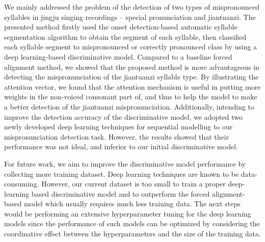 We mainly addressed the problem of the detection of two types of mispronounced syllables in jingju singing recordings -- special pronunciation and \gls{jiantuanzi}. The presented method firstly used the onset detection-based automatic syllable segmentation algorithm to obtain the segment of each syllable, then classified each syllable segment to mispronounced or correctly pronounced class by using a deep learning-based discriminative model. Compared to a baseline forced alignment method, we showed that the proposed method is more advantageous in detecting the mispronunciation of the \gls{jiantuanzi} syllable type. By illustrating the attention vector, we found that the attention mechanism is useful in putting more weights in the non-voiced consonant part of, and thus to help the model to make a better detection of the \gls{jiantuanzi} mispronunciation. Additionally, intending to improve the detection accuracy of the discriminative model, we adopted two newly developed deep learning techniques for sequential modelling to our mispronunciation detection task. However, the results showed that their performance was not ideal, and inferior to our initial discriminative model.

For future work, we aim to improve the discriminative model performance by collecting more training dataset. Deep learning techniques are known to be data-consuming. However, our current dataset is too small to train a proper deep-learning based discriminative model and to outperform the forced alignment-based model which usually requires much less training data. The next steps would be performing an extensive hyperparameter tuning for the deep learning models since the performance of such models can be optimized by considering the coordinative effect between the hyperparameters and the size of the training data.

